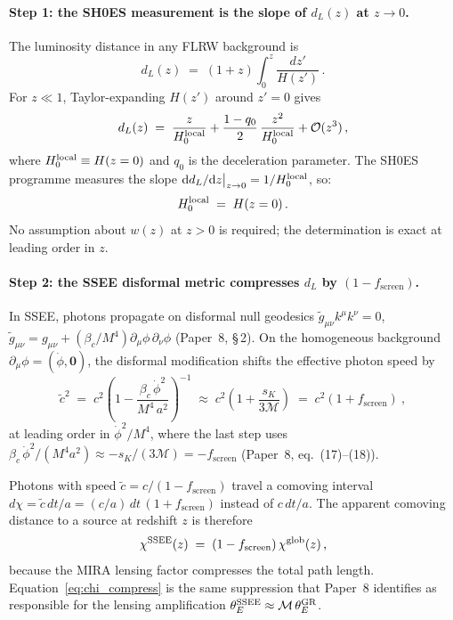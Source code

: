 \documentclass[12pt,a4paper]{article}
\newcommand{\MIRA}{\mathcal{M}}
\newcommand{\bc}{\beta_c}
\newcommand{\fsc}{f_{\mathrm{screen}}}
\newcommand{\sK}{s_K}          %
\begin{document}
\paragraph{Step 1: the SH0ES measurement is the slope of $d_L(z)$ at $z\to 0$.}

The luminosity distance in any FLRW background is
\begin{equation}
  d_L(z) \;=\; (1+z)\int_0^z \frac{dz'}{H(z')}\,.
  \label{eq:dL_def}
\end{equation}
For $z\ll 1$, Taylor-expanding $H(z')$ around $z'=0$ gives
\begin{equation}
  d_L(z) \;=\; \frac{z}{H_0^{\rm local}}
              + \frac{1-q_0}{2}\,\frac{z^2}{H_0^{\rm local}}
              + \mathcal{O}(z^3)\,,
  \label{eq:dL_taylor}
\end{equation}
where $H_0^{\rm local} \equiv H(z=0)$ and $q_0$ is the deceleration parameter.
The SH0ES programme measures the slope $\mathrm{d}d_L/\mathrm{d}z\big|_{z\to 0}
= 1/H_0^{\rm local}$, so:
\begin{equation}
  H_0^{\rm local} \;=\; H(z=0)\,.
  \label{eq:H0local_slope}
\end{equation}
No assumption about $w(z)$ at $z>0$ is required; the determination is exact
at leading order in $z$.

\paragraph{Step 2: the SSEE disformal metric compresses $d_L$ by $(1-\fsc)$.}

In SSEE, photons propagate on disformal null geodesics
$\tilde{g}_{\mu\nu}k^\mu k^\nu = 0$,
$\tilde{g}_{\mu\nu} = g_{\mu\nu} + (\bc/M^4)\partial_\mu\phi\,\partial_\nu\phi$
(Paper~8, \S\,2).
On the homogeneous background $\partial_\mu\phi = (\dot\phi,\mathbf{0})$, the
disformal modification shifts the effective photon speed by
\begin{equation}
  \tilde{c}^2 \;=\; c^2\!\left(1 - \frac{\bc\,\dot\phi^2}{M^4\,a^2}\right)^{-1}
               \;\approx\; c^2\!\left(1 + \frac{\sK}{3\MIRA}\right)
               \;=\; c^2(1 + \fsc)^{}\,,
\end{equation}
at leading order in $\dot\phi^2/M^4$, where the last step uses
$\bc\,\dot\phi^2/(M^4 a^2) \approx -\sK/(3\MIRA) = -\fsc$ (Paper~8,
eq.~(17)--(18)).

Photons with speed $\tilde{c} = c/(1-\fsc)$ travel a comoving interval
$d\chi = \tilde{c}\,dt/a = (c/a)\,dt\,(1+\fsc)$ instead of $c\,dt/a$.
The apparent comoving distance to a source at redshift $z$ is therefore
\begin{equation}
  \chi^{\rm SSEE}(z) \;=\; (1-\fsc)\,\chi^{\rm glob}(z)\,,
  \label{eq:chi_compress}
\end{equation}
because the MIRA lensing factor compresses the total path length.
Equation~\eqref{eq:chi_compress} is the same suppression that Paper~8
identifies as responsible for the lensing amplification
$\theta_E^{\rm SSEE} \approx \MIRA\,\theta_E^{\rm GR}$.
\end{document}
